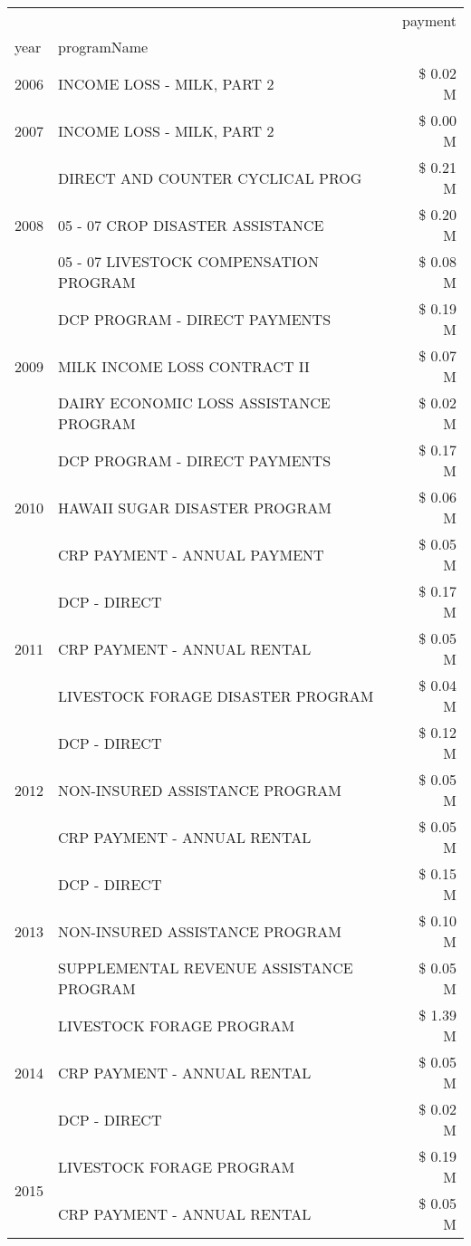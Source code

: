 \begin{tabular}{llr}
\toprule
 &  & payment \\
year & programName &  \\
\midrule
2006 & INCOME LOSS - MILK, PART 2 & \$ 0.02 M \\
\cline{1-3}
2007 & INCOME LOSS - MILK, PART 2 & \$ 0.00 M \\
\cline{1-3}
\multirow[t]{3}{*}{2008} & DIRECT AND COUNTER CYCLICAL PROG & \$ 0.21 M \\
 & 05 - 07 CROP DISASTER ASSISTANCE & \$ 0.20 M \\
 & 05 - 07 LIVESTOCK COMPENSATION PROGRAM & \$ 0.08 M \\
\cline{1-3}
\multirow[t]{3}{*}{2009} & DCP PROGRAM - DIRECT PAYMENTS & \$ 0.19 M \\
 & MILK INCOME LOSS CONTRACT II & \$ 0.07 M \\
 & DAIRY ECONOMIC LOSS ASSISTANCE PROGRAM & \$ 0.02 M \\
\cline{1-3}
\multirow[t]{3}{*}{2010} & DCP PROGRAM - DIRECT PAYMENTS & \$ 0.17 M \\
 & HAWAII SUGAR DISASTER PROGRAM & \$ 0.06 M \\
 & CRP PAYMENT - ANNUAL PAYMENT & \$ 0.05 M \\
\cline{1-3}
\multirow[t]{3}{*}{2011} & DCP - DIRECT & \$ 0.17 M \\
 & CRP PAYMENT - ANNUAL RENTAL & \$ 0.05 M \\
 & LIVESTOCK FORAGE DISASTER PROGRAM & \$ 0.04 M \\
\cline{1-3}
\multirow[t]{3}{*}{2012} & DCP - DIRECT & \$ 0.12 M \\
 & NON-INSURED ASSISTANCE PROGRAM & \$ 0.05 M \\
 & CRP PAYMENT - ANNUAL RENTAL & \$ 0.05 M \\
\cline{1-3}
\multirow[t]{3}{*}{2013} & DCP - DIRECT & \$ 0.15 M \\
 & NON-INSURED ASSISTANCE PROGRAM & \$ 0.10 M \\
 & SUPPLEMENTAL REVENUE ASSISTANCE PROGRAM & \$ 0.05 M \\
\cline{1-3}
\multirow[t]{3}{*}{2014} & LIVESTOCK FORAGE PROGRAM & \$ 1.39 M \\
 & CRP PAYMENT - ANNUAL RENTAL & \$ 0.05 M \\
 & DCP - DIRECT & \$ 0.02 M \\
\cline{1-3}
\multirow[t]{3}{*}{2015} & LIVESTOCK FORAGE PROGRAM & \$ 0.19 M \\
 & CRP PAYMENT - ANNUAL RENTAL & \$ 0.05 M \\

\end{tabular}
